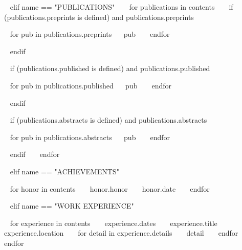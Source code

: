 \begin{minipage}{\textwidth}
~{ elif name == "PUBLICATIONS" }~
~{ for publications in contents }~
  ~{ if (publications.preprints is defined) and publications.preprints }~
  \begin{entrylist}[.1]
    ~{ for pub in publications.preprints}~
    \pubentry
      {~{{ pub }}~}
    ~{ endfor }~
  \end{entrylist}
  ~{ endif }~

  ~{ if (publications.published is defined) and publications.published }~
  \begin{entrylist}[.1]
    ~{ for pub in publications.published}~
    \pubentry
      {~{{ pub }}~}
    ~{ endfor }~
  \end{entrylist}
  ~{ endif }~

  ~{ if (publications.abstracts is defined) and publications.abstracts }~
  \begin{entrylist}[.1]
    ~{ for pub in publications.abstracts}~
    \pubentry
      {~{{ pub }}~}
    ~{ endfor }~
  \end{entrylist}
  ~{ endif }~
~{ endfor }~


~{ elif name == "ACHIEVEMENTS" }~
\begin{entrylist}[.1]
  ~{ for honor in contents }~
  \awardentry
    {~{{ honor.honor }}~}
    {~{{ honor.date }}~}
  ~{ endfor }~
\end{entrylist}



~{ elif name == "WORK EXPERIENCE" }~
\begin{entrylist}
~{ for experience in contents }~
  \entry
    {~{{ experience.dates }}~}
    {~{{ experience.title }}~}
    {~{{ experience.location }}~}
    {~{ for detail in experience.details }~ ~{{ detail }}~ ~{ endfor }~}
~{ endfor }~
\end{entrylist}


\end{minipage}
